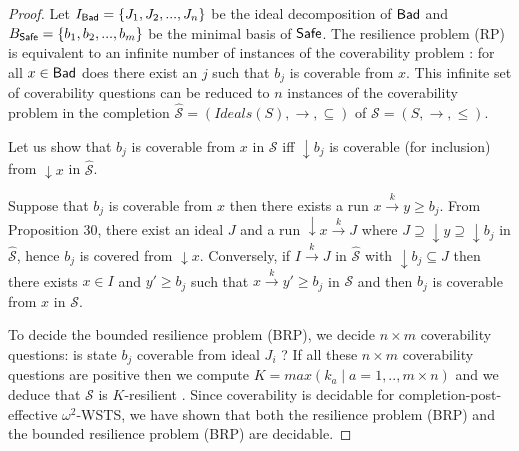 \begin{proof}
Let $I_{\textsf{Bad}}=\{J_1, J_2,...,J_n\}$ be the ideal decomposition of $\textsf{Bad}$ and $B_{\textsf{Safe}}=\{b_1,b_2,...,b_m\}$ be the minimal basis of $\textsf{Safe}$.
The %
resilience problem (RP) is equivalent to an infinite number of instances of the coverability problem : for all $x \in \textsf{Bad}$ does there exist an $j$ such that $b_j$ is coverable from $x$. This infinite set of coverability questions can be reduced to $n$ instances of the coverability problem in the completion $\hat{\mathscr{S}}=(Ideals(S),\rightarrow, \subseteq)$ of $\mathscr{S}=(S,\rightarrow, \leq)$.


Let us show that $b_j$ is coverable from $x$ in $\mathscr{S}$ iff $\downarrow b_j$ is coverable (for inclusion) from $\downarrow x$ in $\hat{\mathscr{S}}$.

Suppose that $b_j$ is coverable from $x$ then there exists a run $x \xrightarrow{k} y \geq b_j$. From Proposition 30, there exist an ideal $J$ and a run $\downarrow x \xrightarrow{k} J$ where $J \supseteq \downarrow y \supseteq \downarrow b_j$ in $\hat{\mathscr{S}}$, hence $b_j$ is covered from $\downarrow x$.
Conversely, if $I \xrightarrow{k} J$ in $\hat{\mathscr{S}}$ with $\downarrow b_j \subseteq J$ then 
there exists $x \in I$ and $y' \geq b_j$ such that $x \xrightarrow{k} y'  \geq b_j$ in $\mathscr{S}$ and then $b_j$ is coverable from $x$ in $\mathscr{S}$.

%

To decide the  bounded resilience problem (BRP), we decide $n \times m$ coverability questions: is state $b_j$ coverable from ideal $J_i$ ? If all these $n \times m$ coverability questions are positive then we compute $K=max(k_a \mid a=1,..,m \times n)$ and we deduce that  $\mathscr{S}$ is $K$-resilient . Since coverability is decidable for completion-post-effective $\omega^2$-WSTS, we have shown that both the 
  resilience problem (BRP) and the  
  bounded resilience problem (BRP) are decidable.
\end{proof}


